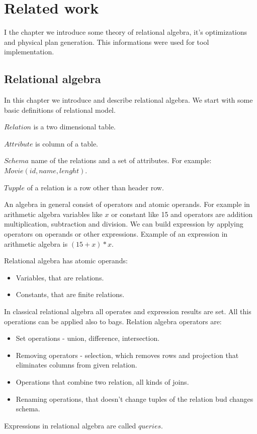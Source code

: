 \chapter{Related work}
I the chapter we introduce some theory of relational algebra, it's optimizations and physical plan generation. This informations were used for tool implementation.
\section{Relational algebra}

In this chapter we introduce and describe relational algebra\cite{database}. We start with some basic definitions of relational model.

\begin{mydef}
$Relation$ is a two dimensional table.
\end{mydef}
\begin{mydef}
$Attribute$ is column of a table.
\end{mydef}
\begin{mydef}
$Schema$ name of the relations and a set of attributes. For example:~$Movie(id,name,lenght)$.
\end{mydef}
\begin{mydef}
$Tupple$ of a relation is a row other than header row.
\end{mydef}


An algebra in general consist of  operators and atomic operands. For example in arithmetic algebra variables like $x$ or constant like 15 and operators are addition multiplication, subtraction and division.
We can build expression by applying operators on operands or other expressions. Example of an expression in arithmetic algebra is $(15+x)*x$.

Relational algebra  has atomic operands:
\begin{itemize}
\item Variables, that are relations.
\item Constants, that are finite relations. 
\end{itemize}

In classical relational algebra all operates and expression results are set. All this operations can be applied also to bags.
Relation algebra operators are:
\begin{itemize}
\item Set operations - union, difference, intersection.
\item Removing operators - selection, which removes rows and projection that eliminates columns from given relation.
\item Operations that combine two relation, all kinds of joins.
\item Renaming operations, that doesn't change tuples of the relation bud changes schema.
\end{itemize}
Expressions in relational algebra are called $queries$.
